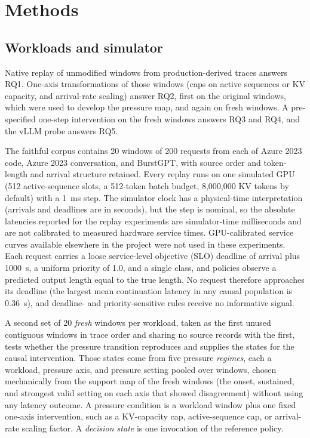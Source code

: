 \documentclass[preprint,12pt]{elsarticle}
\begin{document}
\section{Methods}
\label{sec:methods}

\subsection{Workloads and simulator}
\label{sec:workloads}
Native replay of unmodified windows from production-derived traces answers RQ1.
One-axis transformations of those windows (caps on active sequences or KV
capacity, and arrival-rate scaling) answer RQ2, first on the original windows,
which were used to develop the pressure map, and again on fresh windows. A
pre-specified one-step intervention on the fresh windows answers RQ3 and RQ4,
and the vLLM probe answers RQ5.

The faithful corpus contains 20 windows of 200 requests from each of Azure 2023
code, Azure 2023 conversation, and BurstGPT, with source order and token-length
and arrival structure retained. Every replay runs on one simulated GPU (512
active-sequence slots, a 512-token batch budget, 8,000,000 KV tokens by default)
with a 1~ms step. The simulator clock has a physical-time interpretation
(arrivals and deadlines are in seconds), but the step is nominal, so the absolute
latencies reported for the replay experiments are simulator-time milliseconds and
are not calibrated to measured hardware service times. GPU-calibrated service
curves available elsewhere in the project were not used in these experiments. Each request carries a loose service-level objective (SLO) deadline
of arrival plus 1000~s, a uniform priority of 1.0, and a single class, and
policies observe a predicted output length equal to the true length. No request
therefore approaches its deadline (the largest mean continuation latency in any
causal population is 0.36~s), and deadline- and priority-sensitive rules receive
no informative signal.

A second set of 20 \emph{fresh} windows per workload, taken as the first unused
contiguous windows in trace order and sharing no source records with the first,
tests whether the pressure transition reproduces and supplies the states for the
causal intervention. Those states come from five pressure \emph{regimes}, each a
workload, pressure axis, and pressure setting pooled over windows, chosen
mechanically from the support map of the fresh windows (the onset, sustained,
and strongest valid setting on each axis that showed disagreement) without
using any latency outcome. A pressure condition is a workload window plus one
fixed one-axis intervention, such as a KV-capacity cap, active-sequence cap, or
arrival-rate scaling factor. A \emph{decision state} is one invocation of the
reference policy.
\end{document}
